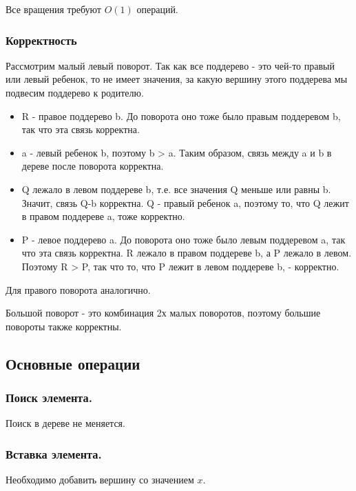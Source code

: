 \Statement Все вращения требуют $O(1)$ операций. 

\subsubsection{Корректность}


\Proof 
Рассмотрим малый левый поворот. Так как все поддерево - это чей-то правый или левый ребенок, то не имеет значения, за какую вершину этого поддерева мы подвесим поддерево к родителю.
\begin{itemize}
    \item R - правое поддерево b. До поворота оно тоже было правым поддеревом b, так что эта связь корректна.
    \item a - левый ребенок b, поэтому b > a. Таким образом, связь между a и b в дереве после поворота корректна.
    \item Q лежало в левом поддереве b, т.е. все значения Q меньше или равны b. Значит, связь Q-b корректна. Q - правый ребенок a, поэтому то, что Q лежит в правом поддереве a, тоже корректно.
    \item P - левое поддерево a. До поворота оно тоже было левым поддеревом a, так что эта связь корректна. R лежало в правом поддереве b, а P лежало в левом. Поэтому R > P, так что то, что P лежит в левом поддереве b, - корректно.
\end{itemize}

Для правого поворота аналогично.

Большой поворот - это комбинация 2х малых поворотов, поэтому большие повороты
также корректны.
\Endproof

\subsection{Основные операции}

\subsubsection*{Поиск элемента.}

Поиск в дереве не меняется.

\subsubsection*{Вставка элемента.}

Необходимо добавить вершину со значением $x$. 

